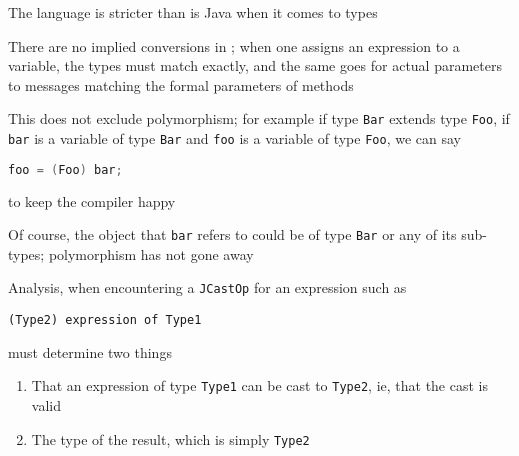 \documentclass[8pt,a4paper,compress]{beamer}
\begin{document}
\begin{frame}[fragile]
\pause

The \jmm language is stricter than is Java when it comes to types

\pause
\bigskip

There are no implied conversions in \jmm; when one assigns an expression to a variable, the types must match exactly, and the same goes for actual parameters to messages matching the formal parameters of methods

\pause
\bigskip

This does not exclude polymorphism; for example if type \lstinline{Bar} extends type \lstinline{Foo}, if \lstinline{bar} is a variable of type \lstinline{Bar} and \lstinline{foo} is a variable of type \lstinline{Foo}, we can say
\begin{lstlisting}[language=Java]
foo = (Foo) bar;
\end{lstlisting}
to keep the \jmm compiler happy

\pause
\bigskip

Of course, the object that \lstinline{bar} refers to could be of type \lstinline{Bar} or any of its sub-types; polymorphism has not gone away

\pause
\bigskip

Analysis, when encountering a \lstinline{JCastOp} for an expression such as 
\begin{lstlisting}[language={}]
    (Type2) expression of Type1
\end{lstlisting}
must determine two things
\begin{enumerate}
\item That an expression of type \lstinline{Type1} can be cast to \lstinline{Type2}, ie, that the cast is valid
\item The type of the result, which is simply \lstinline{Type2}
\end{enumerate}
\end{frame}
\end{document}
